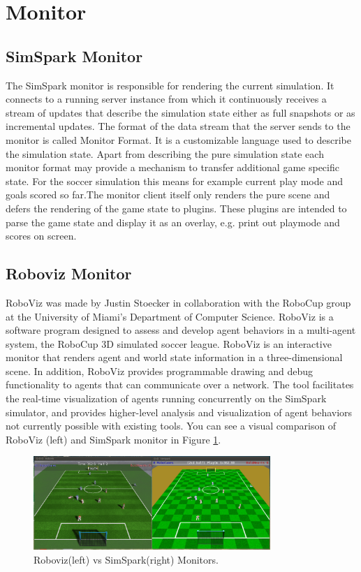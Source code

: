 \section{Monitor}
\subsection{SimSpark Monitor}
The SimSpark monitor is responsible for rendering the current simulation. It connects to a running server instance from which it continuously receives a stream of updates that describe the simulation state either as full snapshots or as incremental updates.
The format of the data stream that the server sends to the monitor is called Monitor Format. It is a customizable language used to describe the simulation state.
Apart from describing the pure simulation state each monitor format may provide a mechanism to transfer additional game specific state. For the soccer simulation this means for example current play mode and goals scored so far.The monitor client itself only renders the pure scene and defers the rendering of the game state to plugins. These plugins are intended to parse the game state and display it as an overlay, e.g. print out playmode and scores on screen.
\subsection{Roboviz Monitor}
\cite{roboviz}
RoboViz was made by Justin Stoecker in collaboration with the RoboCup group at the University of Miami's Department of Computer Science.
RoboViz is a software program designed to assess and develop agent behaviors in a multi-agent system, the RoboCup 3D simulated soccer league. RoboViz is an interactive monitor that renders agent and world state information in a three-dimensional scene. In addition, RoboViz provides programmable drawing and debug functionality to agents that can communicate over a network. The tool facilitates the real-time visualization of agents running concurrently on the SimSpark simulator, and provides higher-level analysis and visualization of agent behaviors not currently possible with existing tools. You can see a visual comparison of RoboViz (left) and SimSpark monitor in Figure \ref{fig:Roboviz}.
\begin{figure}[ht!]
\centering
  \includegraphics[width=0.8\textwidth]{Chapter2/figures/comp2.png}
  \caption{Roboviz(left) vs SimSpark(right) Monitors.\cite{roboviz}} 
  \label{fig:Roboviz}
\end{figure}

